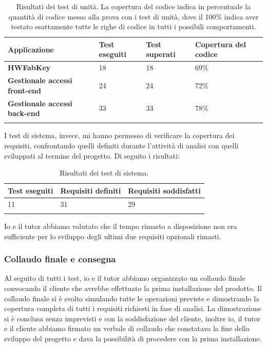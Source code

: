\renewcommand{\arraystretch}{1.2}
\begin{longtable}{|p{2.7cm}|l|l|p{3cm}|}
\hline
\textbf{Applicazione} & \textbf{Test eseguiti} & \textbf{Test superati} & \textbf{Copertura \linebreak del codice} \\ 
\hline
\textbf{HWFabKey} & 18 & 18 & 69\%\\ 
\hline
\textbf{Gestionale accessi front-end} & 24  & 24 & 72\%\\ 
\hline
\textbf{Gestionale accessi back-end} & 33  & 33 & 78\%\\ 
\hline
\caption{Risultati dei test di unità. La copertura del codice indica in percentuale la quantità di codice messo alla prova con i test di unità, dove il 100\% indica aver testato esattamente tutte le righe di codice in tutti i possibili comportamenti.}
\end{longtable}

I test di sistema, invece, mi hanno permesso di verificare la copertura dei requisiti, confrontando quelli definiti durante l'attività di analisi con quelli sviluppati al termine del progetto. Di seguito i risultati:

\begin{longtable}{|p{2.7cm}|l|l|}
\hline
\textbf{Test eseguiti} & \textbf{Requisiti definiti} & \textbf{Requisiti soddisfatti} \\ 
\hline
11 & 31 & 29\\ 
\hline
\caption{Risultati dei test di sistema.}
\end{longtable}

Io e il tutor abbiamo valutato che il tempo rimasto a disposizione non era sufficiente per lo sviluppo degli ultimi due requisiti opzionali rimasti.

\subsubsection{Collaudo finale e consegna}
Al seguito di tutti i test, io e il tutor abbiamo organizzato un collaudo finale convocando il cliente che avrebbe effettuato la prima installazione del prodotto. Il collaudo finale si è svolto simulando tutte le operazioni previste e dimostrando la copertura completa di tutti i requisiti richiesti in fase di analisi.
La dimostrazione si è conclusa senza imprevisti e con la soddisfazione del cliente, inoltre io, il tutor e il cliente abbiamo firmato un verbale di collaudo che constatava la fine dello sviluppo del progetto e dava la possibilità di procedere con la prima installazione.


